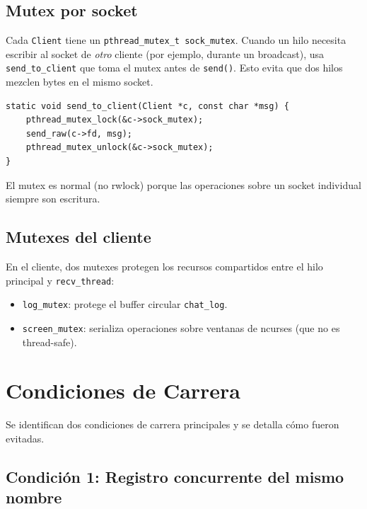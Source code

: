\documentclass[12pt,a4paper]{article}
\begin{document}
\subsection{Mutex por socket}

Cada \texttt{Client} tiene un \texttt{pthread\_mutex\_t sock\_mutex}.  Cuando un
hilo necesita escribir al socket de \textit{otro} cliente (por ejemplo, durante un
broadcast), usa \texttt{send\_to\_client} que toma el mutex antes de
\texttt{send()}.  Esto evita que dos hilos mezclen bytes en el mismo socket.

\begin{lstlisting}[caption={send\_to\_client: escritura protegida a socket ajeno}]
static void send_to_client(Client *c, const char *msg) {
    pthread_mutex_lock(&c->sock_mutex);
    send_raw(c->fd, msg);
    pthread_mutex_unlock(&c->sock_mutex);
}
\end{lstlisting}

El mutex es normal (no rwlock) porque las operaciones sobre un socket individual
siempre son escritura.

\subsection{Mutexes del cliente}

En el cliente, dos mutexes protegen los recursos compartidos entre el hilo principal
y \texttt{recv\_thread}:

\begin{itemize}[nosep]
    \item \texttt{log\_mutex}: protege el buffer circular \texttt{chat\_log}.
    \item \texttt{screen\_mutex}: serializa operaciones sobre ventanas de ncurses
          (que no es thread-safe).
\end{itemize}

\section{Condiciones de Carrera}
\label{sec:races}

Se identifican dos condiciones de carrera principales y se detalla cómo fueron
evitadas.

\subsection{Condición 1: Registro concurrente del mismo nombre}
\end{document}
